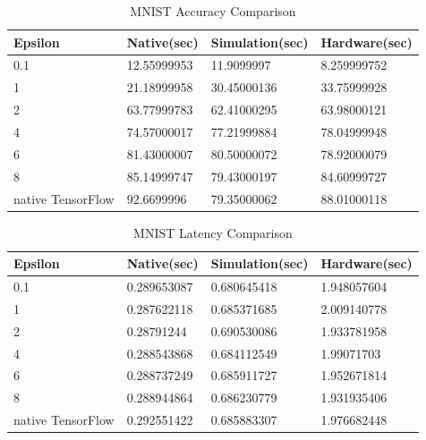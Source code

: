 \begin{table}[h!]
  \begin{center}
    \caption{MNIST Accuracy Comparison}
    \label{tab:table}
    \begin{tabular}{l|l|l|l}
      \textbf{Epsilon} & \textbf{Native(sec)} & \textbf{Simulation(sec)} & \textbf{Hardware(sec)}\\
      \hline
0.1 &        12.55999953 &        11.9099997 &        8.259999752\\
1 &        21.18999958 &        30.45000136 &        33.75999928\\
2 &        63.77999783 &        62.41000295 &        63.98000121\\
4 &        74.57000017 &        77.21999884 &        78.04999948\\
6 &        81.43000007 &        80.50000072 &        78.92000079\\
8 &        85.14999747 &        79.43000197 &        84.60999727\\
native TensorFlow &        92.6699996 &        79.35000062 &        88.01000118\\
    \end{tabular}
   \end{center}
\end{table}
\begin{table}[h!]
  \begin{center}
    \caption{MNIST Latency Comparison}
    \label{tab:table}
    \begin{tabular}{l|l|l|l}
      \textbf{Epsilon} & \textbf{Native(sec)} & \textbf{Simulation(sec)} & \textbf{Hardware(sec)}\\
      \hline
0.1 &        0.289653087 &        0.680645418 &        1.948057604\\
1 &        0.287622118 &        0.685371685 &        2.009140778\\
2 &        0.28791244 &        0.690530086 &        1.933781958\\
4 &        0.288543868 &        0.684112549 &        1.99071703\\
6 &        0.288737249 &        0.685911727 &        1.952671814\\
8 &        0.288944864 &        0.686230779 &        1.931935406\\
native TensorFlow &        0.292551422 &        0.685883307 &        1.976682448\\
    \end{tabular}
   \end{center}
\end{table}




